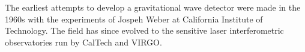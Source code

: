 The earliest attempts to develop a gravitational wave detector were
made in the 1960s with the experiments of Jospeh Weber at California
Institute of Technology. The field has since evolved to the sensitive
laser interferometric observatories run by CalTech and VIRGO.

